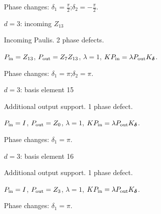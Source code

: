 \par\smallskip\begin{minipage}{.98\linewidth}\small Phase changes: $\delta_{1}=\frac{\pi}{2}$;\quad $\delta_{2}=-\frac{\pi}{2}$.\end{minipage}
\vfill
{\footnotesize\texttt{}}
\newpage
{}
{\Large $d=3$: incoming $Z_{13}$}\par
Incoming Paulis. 2 phase defects.
\begin{center}
\end{center}
\vspace{-1mm}
$P_{\rm in}=Z_{13}$, \quad $P_{\rm out}=Z_{7}Z_{13}$, \quad $\lambda=1$, \qquad $K P_{\rm in}=\lambda P_{\rm out}K_{\boldsymbol\delta}$.
\par\smallskip\begin{minipage}{.98\linewidth}\small Phase changes: $\delta_{1}=\pi$;\quad $\delta_{2}=\pi$.\end{minipage}
\vfill
{\footnotesize\texttt{}}
\newpage
{}
{\Large $d=3$: basis element 15}\par
Additional output support. 1 phase defect.
\begin{center}
\end{center}
\vspace{-1mm}
$P_{\rm in}=I$, \quad $P_{\rm out}=Z_{0}$, \quad $\lambda=1$, \qquad $K P_{\rm in}=\lambda P_{\rm out}K_{\boldsymbol\delta}$.
\par\smallskip\begin{minipage}{.98\linewidth}\small Phase changes: $\delta_{1}=\pi$.\end{minipage}
\vfill
{\footnotesize\texttt{}}
\newpage
{}
{\Large $d=3$: basis element 16}\par
Additional output support. 1 phase defect.
\begin{center}
\end{center}
\vspace{-1mm}
$P_{\rm in}=I$, \quad $P_{\rm out}=Z_{3}$, \quad $\lambda=1$, \qquad $K P_{\rm in}=\lambda P_{\rm out}K_{\boldsymbol\delta}$.
\par\smallskip\begin{minipage}{.98\linewidth}\small Phase changes: $\delta_{1}=\pi$.\end{minipage}
